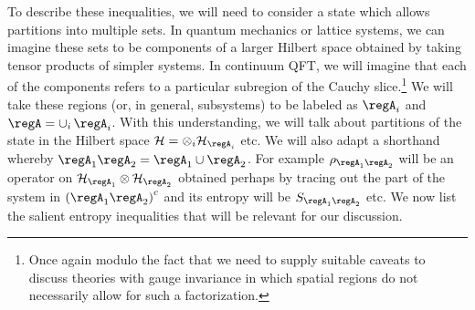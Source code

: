 \documentclass[12pt,openany]{book}
\begin{document}
To describe these inequalities, we will need to consider a state which allows partitions into multiple sets. In quantum mechanics or lattice systems, we can imagine these sets to be components of a larger Hilbert space obtained by taking tensor products of simpler systems. In continuum QFT, we will imagine that each of the components refers to a particular subregion of the Cauchy slice.\footnote{ Once again modulo the fact that we need to supply suitable caveats to discuss theories with gauge invariance in which  spatial regions do not necessarily allow for such a factorization.} We will take these regions (or, in general, subsystems) to be labeled as
$\regA_i$ and $\regA = \cup_i \, \regA_i$.  With this understanding, we will talk about partitions of the state in the Hilbert space ${\cal H} = \otimes_i {\cal H}_{\regA_i}$ etc.
We will also adapt a shorthand whereby $\regA_1 \regA_2 = \regA_1 \cup \regA_2$. For example $\rho_{\regA_1 \regA_2}$  will be an operator on ${\cal H}_{\regA_1} \otimes {\cal H}_{\regA_2}$ obtained perhaps by tracing out the part of the system in $\left(\regA_1 \regA_2\right)^c$ and its entropy will be $S_{\regA_1 \regA_2}$ etc. We now list  the salient entropy inequalities that will be relevant for our discussion.
\end{document}
